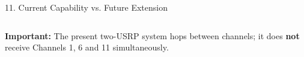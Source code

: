 \documentclass[aspectratio=169,11pt]{beamer}
\begin{document}
\begin{frame}{11. Current Capability vs. Future Extension}
\begin{columns}[T]

\end{columns}

\vspace{0.45cm}

\begin{center}
\textbf{Important:}
The present two-USRP system hops between channels; it does
\textbf{not} receive Channels 1, 6 and 11 simultaneously.
\end{center}

\end{frame}
\end{document}

